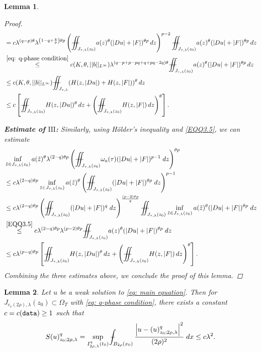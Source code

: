 \documentclass[11pt,oneside, english,reqno,twoside a4paper]{amsart}
\newtheorem{lemma}{Lemma}[section]
\theoremstyle{definition}
\numberwithin{theorem}{section}
\numberwithin{equation}{section}
\def\Xint#1{\mathchoice
	{\XXint\displaystyle\textstyle{#1}}%
	{\XXint\textstyle\scriptstyle{#1}}%
	{\XXint\scriptstyle\scriptscriptstyle{#1}}%
	{\XXint\scriptscriptstyle\scriptscriptstyle{#1}}%
	\!\int}
\def\XXint#1#2#3{{\setbox0=\hbox{$#1{#2#3}{\int}$}
		\vcenter{\hbox{$#2#3$}}\kern-.50\wd0}}
\def\dashint{\Xint-}
\newcommand{\iintss}{{\int\hspace{-0.28cm}\int}}
\newcommand{ \miints }{{\iintss\hspace{-0.56cm} -\hspace{-0.15cm}-}}
\newcommand{\miint}[1]{{\miints_{\hspace{-0.13cm}#1}}}
\begin{document}
\begin{lemma}
\begin{proof}
\begin{align*}
&=c\lambda^{(q-p)\theta}\lambda^{\left(1-q+\frac{q}{p}\right)\theta p}\left(\miint{J_{\tau, \lambda}(z_0)}a(z)^{\theta}(|Du|+|F|)^{\theta p}\,dz\right)^{p-2} \miint{J_{\tau, \lambda}(z_0)}a(z)^{\theta}(|Du|+|F|)^{\theta p}\,dz\\
&\overset{\eqref{eq: q-phase condition}}{\leq} c(K, \theta, ||b||_{L^{\infty}})\lambda^{(q-p+p-pq+q+pq-2q)\theta} \miint{J_{\tau, \lambda}(z_0)}a(z)^{\theta}(|Du|+|F|)^{\theta p}\,dz\\
&\leq c(K, \theta, ||b||_{L^{\infty}}) \miint{J_{\tau, \lambda}}(H(z, |Du|)+H(z, |F|))^{\theta}\, dz\\
&\leq c \left[ \miint{J_{\tau, \lambda}(z_0)}H(z, |Du|)^{\theta}\,dz+\left(\miint{J_{\tau, \lambda}(z_0)}H(z, |F|)\,dz\right)^{\theta}\right].
\end{align*}

\noindent\textbf{Estimate of $\mathrm{III}$:} Similarly, using H\"{o}lder's inequality and \eqref{EQQ3.5}, we can estimate
\begin{align*}
&\inf_{\tilde{z}\in J_{\tau, \lambda}(z_0)}a(\tilde{z})^{\theta}\lambda^{(2-q)\theta p}\left(\miint{J_{\tau,\lambda}(z_0)} \omega_a(\tau) (|Du|+|F|)^{p-1}\; dz \right)^{\theta p}\\
&\leq c\lambda^{(2-q)\theta p}\inf_{\tilde{z}\in J_{\tau, \lambda}(z_0)}a(\tilde{z})^{\theta}\left(\miint{J_{\tau,\lambda}(z_0)} (|Du|+|F|)^{\theta p}\; dz\right)^{p-1}\\
&\leq c\lambda^{(2-q)\theta p}\left(\miint{J_{\tau,\lambda}(z_0)} (|Du|+|F|)^{ q}\; dz\right)^{\frac{(p-2)\theta p}{q}} \miint{J_{\tau,\lambda}(z_0)} \inf_{\tilde{z}\in J_{\tau, \lambda}(z_0)}a(\tilde{z})^{\theta}(|Du|+|F|)^{\theta p}\; dz\\
&\overset{\eqref{EQQ3.5}}{\leq} c\lambda^{(2-q)\theta p}\lambda^{(p-2)\theta p} \miint{J_{\tau,\lambda}(z_0)} a(z)^{\theta}(|Du|+|F|)^{\theta p}\; dz\\
&\leq c\lambda^{(p-q)\theta p}\left[ \miint{J_{\tau, \lambda}(z_0)}H(z, |Du|)^{\theta}\,dz+\left(\miint{J_{\tau, \lambda}(z_0)}H(z, |F|)\,dz\right)^{\theta}\right].
\end{align*}
Combining the three estimates above, we conclude the proof of this lemma.
\end{proof}
\end{lemma}
\begin{lemma}\label{lem : Lemma 3.10}
    Let $u$ be a weak solution to \eqref{eq: main equation}. Then for $J_{c_v(2 \rho),\lambda}(z_0) \subset \Omega_T$ with \eqref{eq: q-phase condition}, there exists a constant $c=c(\textnormal{\texttt{data}}) \geq 1$ such that
    $$
    S(u)^q_{z_0 ; 2 \rho,\lambda}=\sup _{I^q_{2 \rho,\lambda}(t_0)} \dashint_{B_{2 \rho}(x_0)} \frac{\left|u-(u)^q_{z_0 ; 2 \rho,\lambda}\right|^2}{(2 \rho)^2}\; dx \leq c \lambda^2 .
    $$
\end{lemma}
\end{document}
